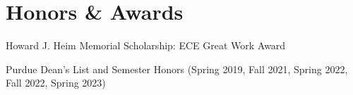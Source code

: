 \section{Honors \& Awards}
\begin{zitemize}
\item Howard J. Heim Memorial Scholarship: ECE Great Work Award %
\item Purdue Dean's List and Semester Honors (Spring 2019, Fall 2021, Spring 2022, Fall 2022, Spring 2023) 
\end{zitemize}

